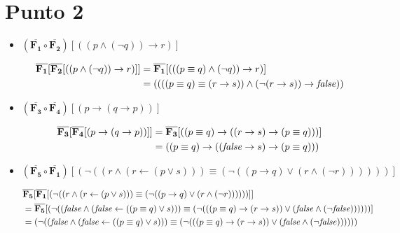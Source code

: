 \documentclass{article}
\newcommand{\val}[2]{\mathbf{#1}[#2]}
\newlength{\logicv}
\newenvironment{logicenv}[2][0]{
  \begin{tcolorbox}[demo, title = #2]
  \vspace*{#1\logicv}
}{
  \end{tcolorbox}
}
\begin{document}
\section{Punto 2}
\begin{itemize}
    \item $\val{(\overline{F_1} \circ \overline{F_2})}{((p \land (\neg q)) \to r)}$
    
    \begin{logicenv}{punto 2}
        \begin{alignat*}{2}
            \val{\overline{F_1}}{\val{\overline{F_2}}{((p \land (\neg q)) \to r)}} &= \val{\overline{F_1}}{(((p \equiv q) \land (\neg q)) \to r)}\\
            & = ((((p \equiv q) \equiv (r \to s)) \land (\neg (r \to s)) \to \textrm{\textit{false}}))
        \end{alignat*}
    \end{logicenv}

    \item $\val{(\overline{F_3} \circ \overline{F_4})}{(p \to (q \to p))}$
    
    \begin{logicenv}{Punto 2}
        \begin{alignat*}{2}
            \val{\overline{F_3}}{\val{\overline{F_4}}{(p \to (q \to p))}} &= \val{\overline{F_3}}{((p \equiv q) \to ((r \to s) \to (p \equiv q)))}\\
            & = ((p \equiv q) \to ((\textrm{\textit{false}} \to s) \to (p \equiv q)))
        \end{alignat*}
    \end{logicenv}

    \item $\val{(\overline{F_5} \circ \overline{F_1})}{(\neg ((r \land (r \gets (p \lor s))) \equiv (\neg ((p \to q) \lor (r \land (\neg r))))))}$
    
    \begin{logicenv}{punto 2}
        \begin{alignat*}{2}
            &\val{\overline{F_5}}{\val{\overline{F_1}}{(\neg ((r \land (r \gets (p \lor s))) \equiv (\neg ((p \to q) \lor (r \land (\neg r))))))}} \\
            &= \val{\overline{F_5}}{(\neg ((\textrm{\textit{false}} \land (\textrm{\textit{false}} \gets ((p \equiv q) \lor s))) \equiv (\neg (((p \equiv q) \to (r \to s)) \lor (\textrm{\textit{false}} \land (\neg \textrm{\textit{false}}))))))}\\
            &= (\neg ((\textrm{\textit{false}} \land (\textrm{\textit{false}} \gets ((p \equiv q) \lor s))) \equiv (\neg (((p \equiv q) \to (r \to s)) \lor (\textrm{\textit{false}} \land (\neg \textrm{\textit{false}}))))))
        \end{alignat*}
    \end{logicenv}


\end{itemize}
\end{document}
